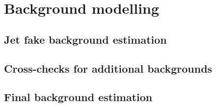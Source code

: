 \chapter{Background modelling\label{sec:bkg}}

\section{Jet fake background estimation\label{sec:bkg-jetfake}}

\section{Cross-checks for additional backgrounds\label{sec:bkg-crosschecks}}

\section{Final background estimation\label{sec:bkg-finalestimate}}
